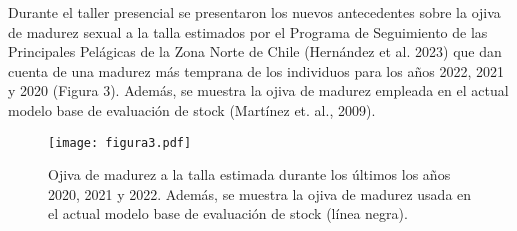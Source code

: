 Durante el taller presencial se presentaron los nuevos antecedentes sobre la ojiva de madurez sexual a la talla estimados por el Programa de Seguimiento de las Principales Pelágicas de la Zona Norte de Chile (Hernández et al. 2023) que dan cuenta de una madurez más temprana de los individuos para los años 2022, 2021 y 2020 (Figura 3). Además, se muestra la ojiva de madurez empleada en el actual modelo base de evaluación de stock (Martínez et. al., 2009). 

\begin{figure}[H]
    \centering
    \texttt{[image: figura3.pdf]}
    \caption{Ojiva de madurez a la talla estimada durante los últimos los años 2020, 2021 y 2022. Además, se muestra la ojiva de madurez usada en el actual modelo base de evaluación de stock (línea negra). }
    \label{fig:figura3}
\end{figure}